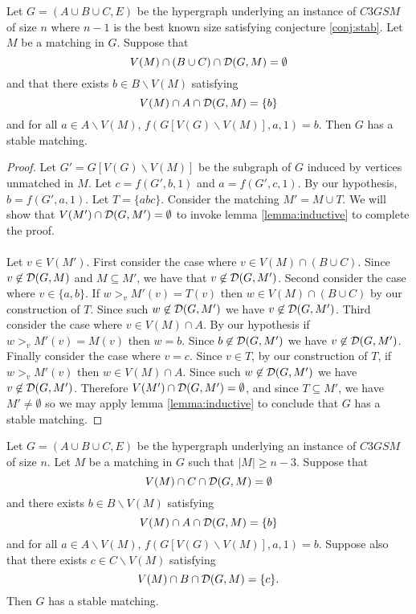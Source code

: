 \begin{lemma} Let $G=(A\cup B \cup C, E)$ be the hypergraph underlying an instance of $C3GSM$ of size $n$ where $n-1$ is the best known size satisfying conjecture \ref{conj:stab}. Let $M$ be a matching in $G$. Suppose that
$$ V(M) \cap (B \cup C) \cap \mathcal{D}(G,M) = \emptyset$$
and that there exists $b \in B\backslash V(M)$ satisfying
$$V(M) \cap A \cap \mathcal{D}(G, M)  = \{b\}$$
and for all $a \in A \backslash V(M)$, $f(G[V(G)\backslash V(M)], a, 1) = b$. Then $G$ has a stable matching.
\end{lemma}
\begin{proof}
Let $G' = G[V(G)\backslash V(M)]$ be the subgraph of $G$ induced by vertices unmatched in $M$. Let $c = f(G',b,1)$ and $a = f(G',c,1)$. By our hypothesis, $b = f(G',a,1)$. Let $T = \{abc\}$. Consider the matching $M' = M \cup T$. We will show that $V(M') \cap \mathcal{D}(G, M') = \emptyset$ to invoke lemma \ref{lemma:inductive} to complete the proof.
\paragraph{}
Let $v \in V(M')$. First consider the case where $v \in V(M) \cap ( B \cup C)$. Since $v \not\in \mathcal{D}(G,M)$ and $M \subseteq M'$, we have that $v \not\in \mathcal{D}(G,M')$. Second consider the case where $v \in \{a,b\}$. If $w >_v M'(v)=T(v)$ then $w \in V(M) \cap (B \cup C)$ by our construction of $T$. Since such $ w\not\in \mathcal{D}(G,M')$ we have $v \not\in \mathcal{D}(G,M')$. Third consider the case where $v \in V(M) \cap A$. By our hypothesis if $w >_v M'(v) = M(v)$ then $w = b$. Since $b \not\in \mathcal{D}(G,M')$ we have $v \not\in \mathcal{D}(G,M')$. Finally consider the case where $v = c$. Since $v \in T$, by our construction of $T$, if $w >_v M'(v)$ then $w \in V(M) \cap A$. Since such $w \not\in \mathcal{D}(G,M')$ we have $v \not\in \mathcal{D}(G,M')$. Therefore $V(M') \cap \mathcal{D}(G,M') = \emptyset$, and since $T \subseteq M'$,  we have $M' \neq \emptyset$ so we may apply lemma \ref{lemma:inductive} to conclude that $G$ has a stable matching.
\end{proof}
\begin{lemma}
Let $G=(A\cup B \cup C, E)$ be the hypergraph underlying an instance of $C3GSM$ of size $n$. Let $M$ be a matching in $G$ such that $|M| \geq n-3$. Suppose that 
$$V(M) \cap C \cap \mathcal{D}(G,M) = \emptyset$$
and there exists $b \in B \backslash V(M)$ satisfying
$$V(M)\cap A \cap \mathcal{D}(G,M) = \{b\}$$
and for all $a \in A \backslash V(M)$, $f(G[V(G)\backslash V(M)], a, 1) = b$. Suppose also that there exists $c \in C \backslash V(M)$ satisfying
$$V(M) \cap B \cap \mathcal{D}(G,M) = \{c\}.$$ 
Then $G$ has a stable matching.
\end{lemma}
